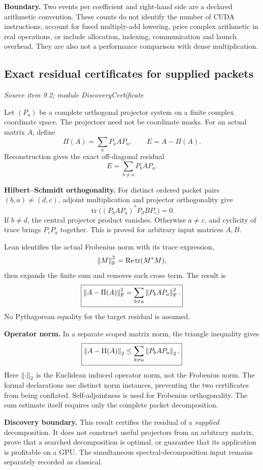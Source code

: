 \textbf{Boundary.} Two events per coefficient and right-hand side are a declared arithmetic convention. These counts do not identify the number of CUDA instructions, account for fused multiply-add lowering, price complex arithmetic in real operations, or include allocation, indexing, communication and launch overhead. They are also not a performance comparison with dense multiplication.



\subsection{Exact residual certificates for supplied packets}\label{supp5:subsection:005}\textit{Source item 9.2; module DiscoveryCertificate}\par
Let $(P_a)$ be a complete orthogonal projector system on a finite complex coordinate space. The projectors need not be coordinate masks. For an actual matrix $A$, define
\[
\Pi(A)=\sum_aP_aAP_a,
\qquad E=A-\Pi(A).
\]
Reconstruction gives the exact off-diagonal residual
\[
E=\sum_{b\ne a}P_bAP_a.
\]

\textbf{Hilbert--Schmidt orthogonality.} For distinct ordered packet pairs $(b,a)\ne(d,c)$, adjoint multiplication and projector orthogonality give
\[
\operatorname{tr}\bigl((P_bAP_a)^*P_dBP_c\bigr)=0.
\]
If $b\ne d$, the central projector product vanishes. Otherwise $a\ne c$, and cyclicity of trace brings $P_cP_a$ together. This is proved for arbitrary input matrices $A,B$.

Lean identifies the actual Frobenius norm with its trace expression,
\[
\left\lVert M\right\rVert_{\rm F}^2=\operatorname{Re}\operatorname{tr}(M^*M),
\]
then expands the finite sum and removes each cross term. The result is
\[
\boxed{\left\lVert A-\Pi(A)\right\rVert_{\rm F}^2
=\sum_{b\ne a}\left\lVert P_bAP_a\right\rVert_{\rm F}^2.}
\]
No Pythagorean equality for the target residual is assumed.

\textbf{Operator norm.} In a separate scoped matrix norm, the triangle inequality gives
\[
\boxed{\left\lVert A-\Pi(A)\right\rVert_2
\leq\sum_{b\ne a}\left\lVert P_bAP_a\right\rVert_2.}
\]
Here $\left\lVert\cdot\right\rVert_2$ is the Euclidean induced operator norm, not the Frobenius norm. The formal declarations use distinct norm instances, preventing the two certificates from being conflated. Self-adjointness is used for Frobenius orthogonality. The sum estimate itself requires only the complete packet decomposition.

\textbf{Discovery boundary.} This result certifies the residual of a \emph{supplied} decomposition. It does not construct useful projectors from an arbitrary matrix, prove that a searched decomposition is optimal, or guarantee that its application is profitable on a GPU. The simultaneous spectral-decomposition input remains separately recorded as classical.




